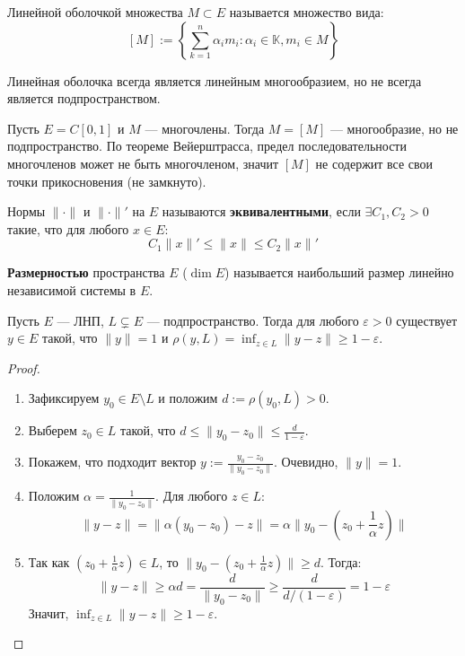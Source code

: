 \begin{definition}
	Линейной оболочкой множества $M \subset E$ называется множество вида:
	\[[M] := \left\{\sum_{k = 1}^n \alpha_i m_i : \alpha_i \in \mathbb{K}, m_i \in M\right\}\]
\end{definition}

\begin{remark}
	Линейная оболочка всегда является линейным многообразием, но не всегда является подпространством.
\end{remark}

\begin{example}
	Пусть $E = C[0,1]$ и $M$ — многочлены. Тогда $M = [M]$ — многообразие, но не подпространство. По теореме Вейерштрасса, предел последовательности многочленов может не быть многочленом, значит $[M]$ не содержит все свои точки прикосновения (не замкнуто).
\end{example}

\begin{definition}
	Нормы $\|\cdot\|$ и $\|\cdot\|'$ на $E$ называются \textbf{эквивалентными}, если $\exists C_1, C_2 > 0$ такие, что для любого $x \in E$:
	\[C_1\|x\|' \leqslant \|x\| \leqslant C_2\|x\|'\]
\end{definition}

\begin{definition}
	\textbf{Размерностью} пространства $E$ ($\dim E$) называется наибольший размер линейно независимой системы в $E$.
\end{definition}

\begin{proposition}\label{almostperp}
	Пусть $E$ --- ЛНП, $L \subsetneq E$ --- подпространство. Тогда для любого $\varepsilon > 0$ существует $y \in E$ такой, что $\|y\| = 1$ и $\rho(y, L) = \inf_{z \in L}\|y - z\| \geqslant 1 - \varepsilon$.
\end{proposition}

\begin{proof}
	\begin{enumerate}
		\item Зафиксируем $y_0 \in E \setminus L$ и положим $d := \rho(y_0, L) > 0$.
		\item Выберем $z_0 \in L$ такой, что $d \leqslant \|y_0 - z_0\| \leqslant \frac{d}{1-\varepsilon}$. 
		\item Покажем, что подходит вектор $y := \frac{y_0 - z_0}{\|y_0 - z_0\|}$. Очевидно, $\|y\| = 1$.
		\item Положим $\alpha = \frac{1}{\|y_0 - z_0\|}$. Для любого $z \in L$:
		\[ \|y - z\| = \|\alpha(y_0 - z_0) - z\| = \alpha \| y_0 - (z_0 + \frac{1}{\alpha} z) \| \]
		\item Так как $(z_0 + \frac{1}{\alpha} z) \in L$, то $\|y_0 - (z_0 + \frac{1}{\alpha} z)\| \geqslant d$. Тогда:
		\[ \|y - z\| \geqslant \alpha d = \frac{d}{\|y_0 - z_0\|} \geqslant \frac{d}{d/(1-\varepsilon)} = 1 - \varepsilon \]
		Значит, $\inf_{z \in L}\|y - z\| \geqslant 1 - \varepsilon$.
	\end{enumerate}
\end{proof}

